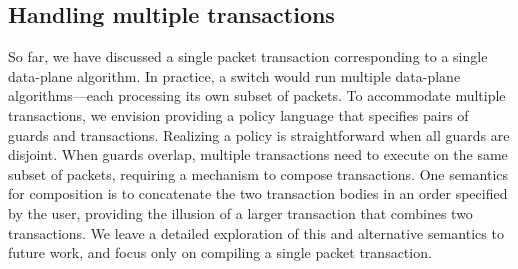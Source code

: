 
\subsection{Handling multiple transactions}
\label{ss:multiple}
So far, we have discussed a single packet transaction corresponding to a single
data-plane algorithm. In practice, a switch
would run multiple data-plane algorithms---each processing its own subset of
packets. To accommodate multiple transactions, we envision providing a policy
language that specifies pairs of guards and transactions. Realizing a policy is
straightforward when all guards are disjoint. When guards overlap, multiple
transactions need to execute on the same subset of packets, requiring a
mechanism to compose transactions. One semantics for composition is to concatenate the two
transaction bodies in an order specified by the user, providing the illusion of
a larger transaction that combines two transactions. We leave a detailed
exploration of this and alternative semantics to future work,
and focus only on compiling a single packet transaction.


